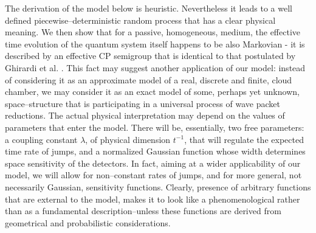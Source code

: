 \documentclass[12pt]{article}
\begin{document}
The derivation of the model below is heuristic. Nevertheless it leads to a
well defined piecewise--deterministic random process that has a clear
physical meaning. We then show that for a passive, homogeneous, medium, the
effective time evolution of the quantum system itself happens to be also
Markovian - it is described by an effective CP semigroup that is identical
to that postulated by Ghirardi et al. \cite{ghi1}. This fact may suggest
another application of our model: instead of considering it as an
approximate model of a real, discrete and finite, cloud chamber, we may
consider it as an exact model of some, perhaps yet unknown,
space--structure that is participating in a universal process of wave
packet reductions. The actual physical interpretation may depend on the
values of parameters that enter the model. There will be, essentially, two
free parameters: a coupling constant $\lambda$, of physical dimension
$t^{-1}$, that will regulate the expected time rate of jumps, and a
normalized Gaussian function whose width determines space sensitivity of
the detectors. In fact, aiming at a wider applicability of our model, we
will allow for non--constant rates of jumps, and for more general, not
necessarily Gaussian, sensitivity functions. Clearly, presence of arbitrary
functions that are external to the model, makes it to look like a
phenomenological rather than as a fundamental description--unless these
functions are derived from geometrical and probabilistic considerations.
\end{document}
